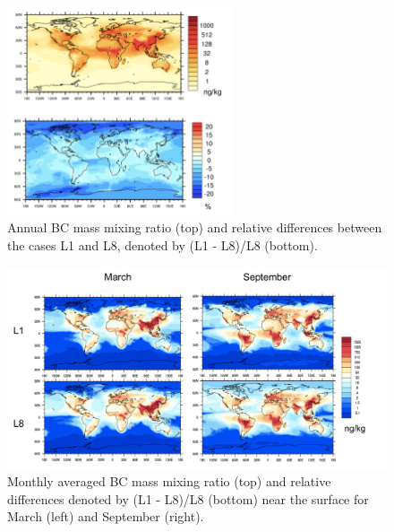 \documentclass[12pt, fullpage]{uiucthesis2009}
\begin{document}
	\begin{figure}[h] 
		\begin{center}
			\includegraphics[width = 0.6\textwidth]{Figure13}
			\caption[Annually averaged BC mass mixing ratio (top) and relative differences denoted by (L1 - L8)/L8 (bottom)]{\label{fig_P13} Annual BC mass mixing ratio (top) and relative differences between the cases L1 and L8, denoted by (L1 - L8)/L8 (bottom).}
		\end{center}
	\end{figure}
	
	\begin{figure}[h] 
			\begin{center}
				\includegraphics[width = 1\textwidth]{Figure21}
				\caption[Monthly averaged BC mass mixing ratio (top) and relative differences denoted by (L1 - L8)/L8 (bottom) near the surface for March (left) and September (right).]{\label{fig_P21} Monthly averaged BC mass mixing ratio (top) and relative differences denoted by (L1 - L8)/L8 (bottom) near the surface for March (left) and September (right).}
			\end{center}
		\end{figure}
	
\end{document}
